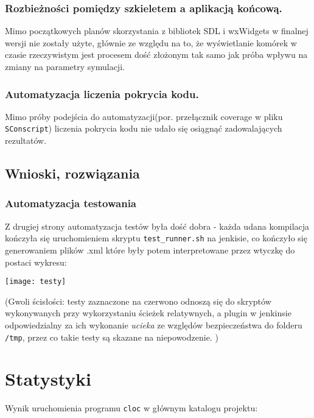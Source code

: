 \documentclass{article}
\begin{document}
	\subsubsection{Rozbieżności pomiędzy szkieletem a aplikacją końcową.}
	Mimo początkowych planów skorzystania z bibliotek SDL i wxWidgets w finalnej wersji nie zostały użyte, głównie ze względu na to, że wyświetlanie komórek w czasie rzeczywistym jest procesem dość złożonym tak samo jak próba wpływu na zmiany na parametry symulacji. 
	
	\subsubsection{Automatyzacja liczenia pokrycia kodu.}
	Mimo próby podejścia do automatyzacji(por. przełącznik coverage w pliku \texttt{SConscript}) liczenia pokrycia kodu nie udało się osiągnąć zadowalających rezultatów.
	
	\subsection{Wnioski, rozwiązania}
 	
 	\subsubsection{Automatyzacja testowania}
 	Z drugiej strony automatyzacja testów była dość dobra - każda udana kompilacja kończyła się uruchomieniem skryptu \texttt{test\_runner.sh} na jenkisie, co kończyło się generowaniem plików .xml które były potem interpretowane przez wtyczkę do postaci wykresu:
 	
 	
 	\texttt{[image: testy]} 
 	
 	(Gwoli ścisłości: testy zaznaczone na czerwono odnoszą się do skryptów wykonywanych przy wykorzystaniu ścieżek relatywnych, a plugin w jenkinsie odpowiedzialny za ich wykonanie \textit{ucieka} ze względów bezpieczeństwa do folderu \texttt{/tmp}, przez co takie testy są skazane na niepowodzenie. )
 	
 	
\section{Statystyki}
Wynik uruchomienia programu \texttt{cloc} w głównym katalogu projektu:

\newpage
\end{document}
